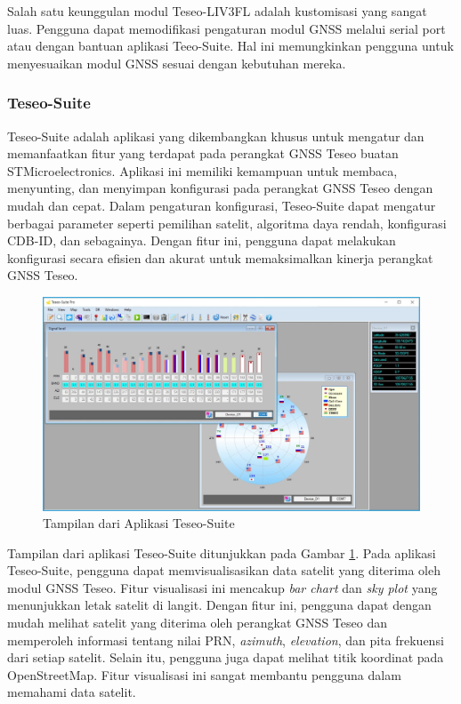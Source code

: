 Salah satu keunggulan modul Teseo-LIV3FL adalah kustomisasi yang sangat luas. Pengguna dapat memodifikasi pengaturan modul GNSS melalui serial port atau dengan bantuan aplikasi Teeo-Suite. Hal ini memungkinkan pengguna untuk menyesuaikan modul GNSS sesuai dengan kebutuhan mereka.

\subsubsection{Teseo-Suite}
Teseo-Suite adalah aplikasi yang dikembangkan khusus untuk mengatur dan memanfaatkan fitur yang terdapat pada perangkat GNSS Teseo buatan STMicroelectronics. Aplikasi ini memiliki kemampuan untuk membaca, menyunting, dan menyimpan konfigurasi pada perangkat GNSS Teseo dengan mudah dan cepat. Dalam pengaturan konfigurasi, Teseo-Suite dapat mengatur berbagai parameter seperti pemilihan satelit, algoritma daya rendah, konfigurasi CDB-ID, dan sebagainya. Dengan fitur ini, pengguna dapat melakukan konfigurasi secara efisien dan akurat untuk memaksimalkan kinerja perangkat GNSS Teseo.

\begin{figure}[H]
	\centering
	\includegraphics[width=13cm]{contents/chapter-2/teseo-suite.jpeg}
	\caption{Tampilan dari Aplikasi Teseo-Suite}
	\label{Fig: teseo-suite-ss}
\end{figure}

Tampilan dari aplikasi Teseo-Suite ditunjukkan pada Gambar \ref{Fig: teseo-suite-ss}. Pada aplikasi Teseo-Suite, pengguna dapat memvisualisasikan data satelit yang diterima oleh modul GNSS Teseo. Fitur visualisasi ini mencakup \textit{bar chart} dan \textit{sky plot} yang menunjukkan letak satelit di langit. Dengan fitur ini, pengguna dapat dengan mudah melihat satelit yang diterima oleh perangkat GNSS Teseo dan memperoleh informasi tentang nilai PRN, \textit{azimuth}, \textit{elevation}, dan pita frekuensi dari setiap satelit. Selain itu, pengguna juga dapat melihat titik koordinat pada OpenStreetMap. Fitur visualisasi ini sangat membantu pengguna dalam memahami data satelit.

